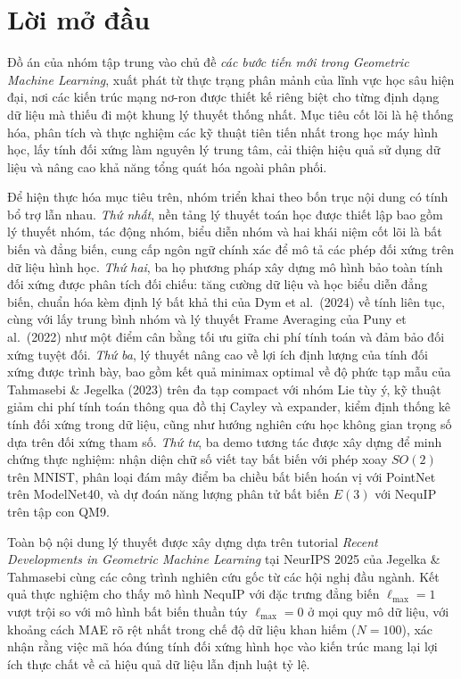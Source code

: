 \documentclass[oneside]{hcmus-report}
\theoremstyle{plain}
\theoremstyle{definition}
\begin{document}
\section*{Lời mở đầu}

Đồ án của nhóm tập trung vào chủ đề \textit{các bước tiến mới trong Geometric Machine Learning}, xuất phát từ thực trạng phân mảnh của lĩnh vực học sâu hiện đại, nơi các kiến trúc mạng nơ-ron được thiết kế riêng biệt cho từng định dạng dữ liệu mà thiếu đi một khung lý thuyết thống nhất. Mục tiêu cốt lõi là hệ thống hóa, phân tích và thực nghiệm các kỹ thuật tiên tiến nhất trong học máy hình học, lấy tính đối xứng làm nguyên lý trung tâm, cải thiện hiệu quả sử dụng dữ liệu và nâng cao khả năng tổng quát hóa ngoài phân phối.

Để hiện thực hóa mục tiêu trên, nhóm triển khai theo bốn trục nội dung có tính bổ trợ lẫn nhau. \textit{Thứ nhất}, nền tảng lý thuyết toán học được thiết lập bao gồm lý thuyết nhóm, tác động nhóm, biểu diễn nhóm và hai khái niệm cốt lõi là bất biến và đẳng biến, cung cấp ngôn ngữ chính xác để mô tả các phép đối xứng trên dữ liệu hình học. \textit{Thứ hai}, ba họ phương pháp xây dựng mô hình bảo toàn tính đối xứng được phân tích đối chiếu: tăng cường dữ liệu và học biểu diễn đẳng biến, chuẩn hóa kèm định lý bất khả thi của Dym et al.\ (2024) về tính liên tục, cùng với lấy trung bình nhóm và lý thuyết Frame Averaging của Puny et al.\ (2022) như một điểm cân bằng tối ưu giữa chi phí tính toán và đảm bảo đối xứng tuyệt đối. \textit{Thứ ba}, lý thuyết nâng cao về lợi ích định lượng của tính đối xứng được trình bày, bao gồm kết quả minimax optimal về độ phức tạp mẫu của Tahmasebi \& Jegelka (2023) trên đa tạp compact với nhóm Lie tùy ý, kỹ thuật giảm chi phí tính toán thông qua đồ thị Cayley và expander, kiểm định thống kê tính đối xứng trong dữ liệu, cũng như hướng nghiên cứu học không gian trọng số dựa trên đối xứng tham số. \textit{Thứ tư}, ba demo tương tác được xây dựng để minh chứng thực nghiệm: nhận diện chữ số viết tay bất biến với phép xoay $SO(2)$ trên MNIST, phân loại đám mây điểm ba chiều bất biến hoán vị với PointNet trên ModelNet40, và dự đoán năng lượng phân tử bất biến $E(3)$ với NequIP trên tập con QM9.

Toàn bộ nội dung lý thuyết được xây dựng dựa trên tutorial \textit{Recent Developments in Geometric Machine Learning} tại NeurIPS 2025 của Jegelka \& Tahmasebi \cite{jegelka2025tutorial} cùng các công trình nghiên cứu gốc từ các hội nghị đầu ngành. Kết quả thực nghiệm cho thấy mô hình NequIP với đặc trưng đẳng biến $\ell_{\max}=1$ vượt trội so với mô hình bất biến thuần túy $\ell_{\max}=0$ ở mọi quy mô dữ liệu, với khoảng cách MAE rõ rệt nhất trong chế độ dữ liệu khan hiếm ($N=100$), xác nhận rằng việc mã hóa đúng tính đối xứng hình học vào kiến trúc mang lại lợi ích thực chất về cả hiệu quả dữ liệu lẫn định luật tỷ lệ.
\end{document}
